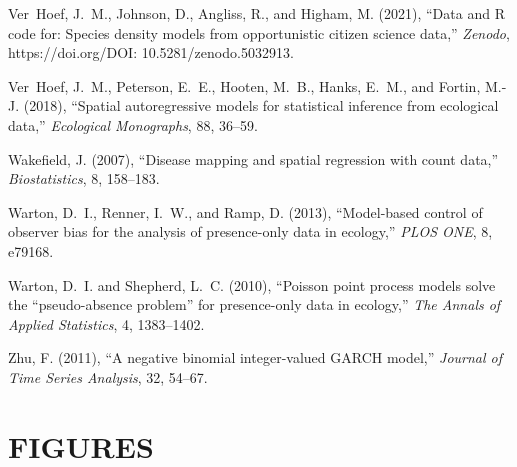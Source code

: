 \documentclass[11pt, titlepage]{article}
\begin{document}
\begin{spacing}{1.9}
\begin{flushleft}
\begin{thebibliography}{59}
Ver~Hoef, J.~M., Johnson, D., Angliss, R., and Higham, M. (2021), \enquote{Data
  and {R} code for: {Species} density models from opportunistic citizen science
  data,} \textit{Zenodo}, https://doi.org/DOI: 10.5281/zenodo.5032913.

Ver~Hoef, J.~M., Peterson, E.~E., Hooten, M.~B., Hanks, E.~M., and Fortin,
  M.-J. (2018), \enquote{Spatial autoregressive models for statistical
  inference from ecological data,} \textit{Ecological Monographs}, 88, 36--59.

Wakefield, J. (2007), \enquote{Disease mapping and spatial regression with
  count data,} \textit{Biostatistics}, 8, 158--183.

Warton, D.~I., Renner, I.~W., and Ramp, D. (2013), \enquote{Model-based control
  of observer bias for the analysis of presence-only data in ecology,}
  \textit{PLOS ONE}, 8, e79168.

Warton, D.~I. and Shepherd, L.~C. (2010), \enquote{Poisson point process models
  solve the “pseudo-absence problem” for presence-only data in ecology,}
  \textit{The Annals of Applied Statistics}, 4, 1383--1402.

Zhu, F. (2011), \enquote{A negative binomial integer-valued {GARCH} model,}
  \textit{Journal of Time Series Analysis}, 32, 54--67.

\end{thebibliography}


\newpage
{}

\section*{FIGURES}



\end{flushleft}
\end{spacing}
\end{document}
